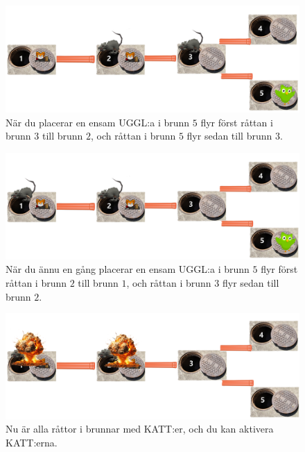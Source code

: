 \begin{centering}
  \begin{figure}[h]
    \centering
    \includegraphics[scale=0.2]{rats_graph step2.png}
    \caption{När du placerar en ensam UGGL:a i brunn $5$ flyr först råttan i brunn $3$ till brunn $2$, och råttan i brunn $5$ flyr sedan till brunn $3$.}
  \end{figure}
\end{centering}

\begin{centering}
  \begin{figure}[h]
    \centering
    \includegraphics[scale=0.2]{rats_graph step3.png}
    \caption{När du ännu en gång placerar en ensam UGGL:a i brunn $5$ flyr först råttan i brunn $2$ till brunn $1$, och råttan i brunn $3$ flyr sedan till brunn $2$.}
  \end{figure}
\end{centering}

\begin{centering}
  \begin{figure}[h]
    \centering
    \includegraphics[scale=0.2]{rats_graph step4 activate.png}
    \caption{Nu är alla råttor i brunnar med KATT:er, och du kan aktivera KATT:erna.}
  \end{figure}
\end{centering}